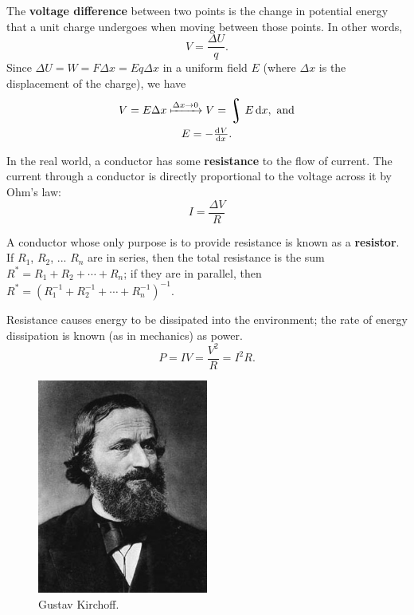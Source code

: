 \documentclass[a4paper]{amsbook}
\theoremstyle{definition}
\numberwithin{exercise}{chapter}
\numberwithin{exercise}{chapter}
\DeclareMathOperator*{\rint}{\scalerel*{\rotatebox{17}{$\!\int\!$}}{\int}}
\begin{document}
The \textbf{voltage difference} between two points is the change in potential energy that a unit charge undergoes when moving
between those points. In other words,
\begin{equation}
  V = \frac{\Delta U}{q}.
\end{equation}
Since $ \Delta U = W = F \Delta x = Eq \Delta x $ in a uniform field $ E $ (where $ \Delta x $ is the displacement of the charge), we have
\begin{gather}
  V = E \Delta x \xmapsto{\Delta x \to 0} V = \rint E \dif{x}, \text{ and}\\
  E = -\od{V}{x}.
\end{gather}

In the real world, a conductor has some \textbf{resistance} to the flow of current. The current through a conductor is
directly proportional to the voltage across it by Ohm's law:
\begin{equation}
  I = \frac{\Delta V}{R}
\end{equation}

A conductor whose only purpose is to provide resistance is known as a \textbf{resistor}. If $ R_1 $, $ R_2 $, ... $ R_n $ are in series,
then the total resistance is the sum $ R^* = R_1 + R_2 + \cdots + R_n $; if they are in parallel, then $ R^* = (R_1^{-1} + R_2^{-1} + \cdots + R_n^{-1})^{-1} $.

Resistance causes energy to be dissipated into the environment; the rate of energy dissipation is known (as in mechanics) as power.
\begin{equation}
  P = IV = \frac{V^2}{R} = I^2 R.
\end{equation}

\begin{figure}
  \centering
  \includegraphics[width=0.5\textwidth]{kirchoff}
  \caption{Gustav Kirchoff.}\label{fig:kirchoff}
\end{figure}
\end{document}
